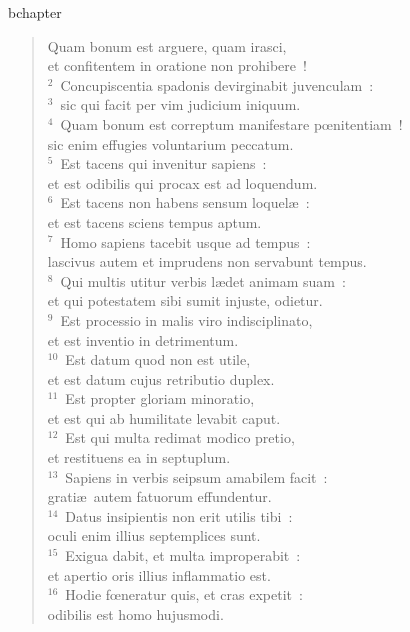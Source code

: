 bchapter\begin{verse}\vspace{-19pt}Quam bonum est arguere, quam irasci,\\ et confitentem in oratione non prohibere~!\\
${}^{2}$~Concupiscentia spadonis devirginabit juvenculam~:\\
${}^{3}$~sic qui facit per vim judicium iniquum.\\
${}^{4}$~Quam bonum est correptum manifestare pœnitentiam~!\\ sic enim effugies voluntarium peccatum.\\
${}^{5}$~Est tacens qui invenitur sapiens~:\\ et est odibilis qui procax est ad loquendum.\\
${}^{6}$~Est tacens non habens sensum loquel\ae~:\\ et est tacens sciens tempus aptum.\\
${}^{7}$~Homo sapiens tacebit usque ad tempus~:\\ lascivus autem et imprudens non servabunt tempus.\\
${}^{8}$~Qui multis utitur verbis l\ae det animam suam~:\\ et qui potestatem sibi sumit injuste, odietur.\\
${}^{9}$~Est processio in malis viro indisciplinato,\\ et est inventio in detrimentum.\\
${}^{10}$~Est datum quod non est utile,\\ et est datum cujus retributio duplex.\\
${}^{11}$~Est propter gloriam minoratio,\\ et est qui ab humilitate levabit caput.\\
${}^{12}$~Est qui multa redimat modico pretio,\\ et restituens ea in septuplum.\\
${}^{13}$~Sapiens in verbis seipsum amabilem facit~:\\ grati\ae\ autem fatuorum effundentur.\\
${}^{14}$~Datus insipientis non erit utilis tibi~:\\ oculi enim illius septemplices sunt.\\
${}^{15}$~Exigua dabit, et multa improperabit~:\\ et apertio oris illius inflammatio est.\\
${}^{16}$~Hodie fœneratur quis, et cras expetit~:\\ odibilis est homo hujusmodi.\\

\end{verse}
